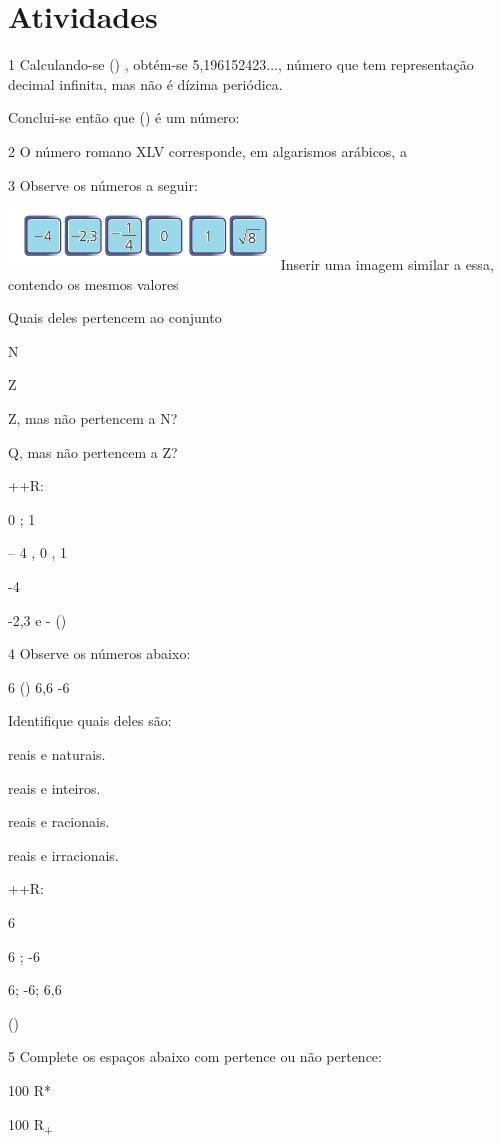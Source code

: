 \section{Atividades}

\num{1} Calculando-se () , obtém-se 5,196152423..., número que tem
representação decimal infinita, mas não é dízima periódica.

Conclui-se então que () é um número:


\num{2} O número romano XLV corresponde, em algarismos arábicos, a


\num{3} Observe os números a seguir:

\includegraphics[width=2.79167in,height=0.63542in]{./imgSAEB_8_MAT/media/image1.png}
Inserir uma imagem similar a essa, contendo os mesmos valores

Quais deles pertencem ao conjunto
\item N
\item Z
\item Z, mas não pertencem a N?
\item Q, mas não pertencem a Z?

++R:
\item 0 ; 1
\item -- 4 , 0 , 1
\item -4
\item -2,3 e - ()

\num{4} Observe os números abaixo:

6 () 6,6 -6

Identifique quais deles são:
\item reais e naturais.
\item reais e inteiros.
\item reais e racionais.
\item reais e irracionais.

++R:
\item 6
\item 6 ; -6
\item 6; -6; 6,6
\item ()

\num{5} Complete os espaços abaixo com pertence ou não pertence:
\item 100 R*
\item 100 R\textsubscript{+}

